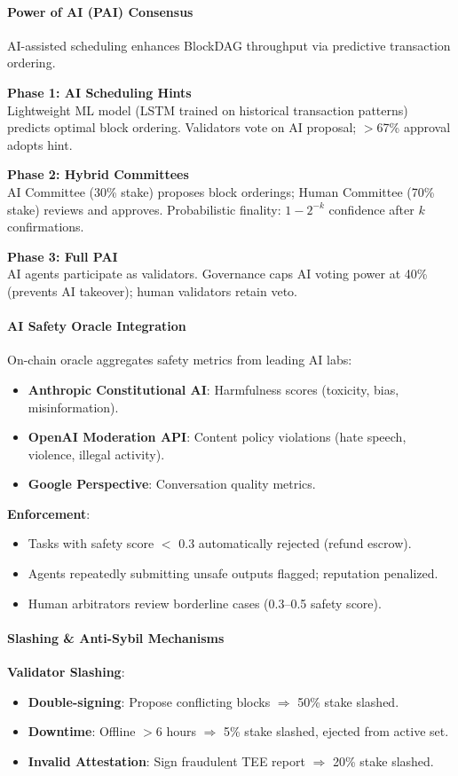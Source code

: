 \documentclass[11pt]{article}
\begin{document}
\paragraph{Power of AI (PAI) Consensus}
AI-assisted scheduling enhances BlockDAG throughput via predictive transaction ordering.

\textbf{Phase 1: AI Scheduling Hints}\\
Lightweight ML model (LSTM trained on historical transaction patterns) predicts optimal block ordering. Validators vote on AI proposal; $>$67\% approval adopts hint.

\textbf{Phase 2: Hybrid Committees}\\
AI Committee (30\% stake) proposes block orderings; Human Committee (70\% stake) reviews and approves. Probabilistic finality: $1 - 2^{-k}$ confidence after $k$ confirmations.

\textbf{Phase 3: Full PAI}\\
AI agents participate as validators. Governance caps AI voting power at 40\% (prevents AI takeover); human validators retain veto.

\paragraph{AI Safety Oracle Integration}
On-chain oracle aggregates safety metrics from leading AI labs:
\begin{itemize}[noitemsep]
  \item \textbf{Anthropic Constitutional AI}: Harmfulness scores (toxicity, bias, misinformation).
  \item \textbf{OpenAI Moderation API}: Content policy violations (hate speech, violence, illegal activity).
  \item \textbf{Google Perspective}: Conversation quality metrics.
\end{itemize}

\textbf{Enforcement}:
\begin{itemize}[noitemsep]
  \item Tasks with safety score $<$ 0.3 automatically rejected (refund escrow).
  \item Agents repeatedly submitting unsafe outputs flagged; reputation penalized.
  \item Human arbitrators review borderline cases (0.3--0.5 safety score).
\end{itemize}

\paragraph{Slashing \& Anti-Sybil Mechanisms}
\textbf{Validator Slashing}:
\begin{itemize}[noitemsep]
  \item \textbf{Double-signing}: Propose conflicting blocks $\Rightarrow$ 50\% stake slashed.
  \item \textbf{Downtime}: Offline $>$6 hours $\Rightarrow$ 5\% stake slashed, ejected from active set.
  \item \textbf{Invalid Attestation}: Sign fraudulent TEE report $\Rightarrow$ 20\% stake slashed.
\end{itemize}
\end{document}
